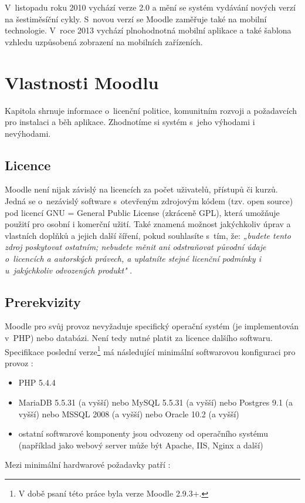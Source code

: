 \documentclass[
print,
  11pt,
  table,   
  nolof,    
  nolot,
  oneside,
  draft
]{fithesis3}
\begin{document}
V~listopadu roku 2010 vychází verze 2.0 a mění se systém vydávání nových verzí na šestiměsíční cykly. S~novou verzí se Moodle zaměřuje také na mobilní technologie. V~roce 2013 vychází plnohodnotná mobilní aplikace a také šablona vzhledu uzpůsobená zobrazení na mobilních zařízeních.

		

	\section{Vlastnosti Moodlu}
Kapitola shrnuje informace o~licenční politice, komunitním rozvoji a požadavcích pro instalaci a běh aplikace. Zhodnotíme si systém s~jeho výhodami i nevýhodami.
		\subsection{Licence}
Moodle není nijak závislý na licencích za počet uživatelů, přístupů či kurzů. Jedná se o~nezávislý software s~otevřeným zdrojovým kódem (tzv. open source) pod licencí GNU = General Public License (zkráceně GPL), která umožňuje použití pro osobní i komerční užití. Také znamená možnost jakýchkoliv úprav a vlastních doplňků a jejich další šíření, pokud souhlasíte s~tím, že: \emph{„budete tento zdroj poskytovat ostatním; nebudete měnit ani odstraňovat původní údaje o~licencích a autorských právech, a uplatníte stejné licenční podmínky i u~jakýchkoliv odvozených produkt"} \cite{moodle-what-is}. 
		\subsection{Prerekvizity}
Moodle pro svůj provoz nevyžaduje specifický operační systém (je implementován v~PHP) nebo databázi. Není tedy nutné platit za licence dalšího softwaru. Specifikace poslední verze\footnote{V době psaní této práce byla verze Moodle 2.9.3+.}  má následující minimální softwarovou konfiguraci pro provoz \cite{softprereq}:
\begin{itemize}
\item PHP 5.4.4
\item MariaDB 5.5.31 (a vyšší) nebo MySQL 5.5.31 (a vyšší) nebo Postgres 9.1 (a vyšší) nebo MSSQL 2008 (a vyšší) nebo Oracle 10.2 (a vyšší)
\item ostatní softwarové komponenty jsou odvozeny od operačního systému (například jako webový server může být Apache, IIS, Nginx a další) 
\end{itemize}

Mezi minimální hardwarové požadavky patří \cite{hardprereq}:
\end{document}
